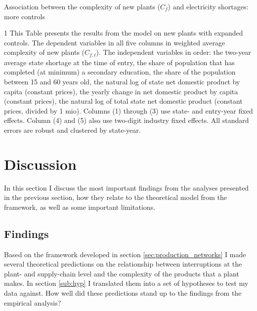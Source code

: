 \documentclass[11pt]{article}
\begin{document}
\begin{table} 
	\begin{center}
		\begin{threeparttable}
			\caption{Association between the complexity of new plants ($C_f$) and electricity shortages: more controls}
			\label{tab:entry_max_avg}
			
			\begin{tablenotes} \footnotesize 
			\item[1] This Table presents the results from the model on new plants with expanded controls. The dependent variables in all five columns in weighted average complexity of new plants ($C_{f,t}$). The independent variables in order: the two-year average state shortage at the time of entry, the share of population that has completed (at minimum) a secondary education, the share of the population between 15 and 60 years old, the natural log of state net domestic product by capita (constant prices), the yearly change in net domestic product by capita (constant prices), the natural log of total state net domestic product (constant prices, divided by 1 mio). Columns (1) through (3) use state- and entry-year fixed effects. Column (4) and (5) also use two-digit industry fixed effects. All standard errors are robust and clustered by state-year.
			\end{tablenotes}
		\end{threeparttable}
	\end{center}
\end{table}   



\newpage


\section{Discussion}%
\label{sec:discussion}
In this section I discuss the most important findings from the analyses presented in the previous section, how they relate to the theoretical model from the framework, as well as some important limitations. 

\subsection{Findings}
\label{sub:findings}

Based on the framework developed in section \ref{sec:production_networks} I made several theoretical predictions on the relationship between interruptions at the plant- and supply-chain level and the complexity of the products that a plant makes. In section \ref{sub:hyp} I translated them into a set of hypotheses to test my data against. How well did these predictions stand up to the findings from the empirical analysis? 
\end{document}
